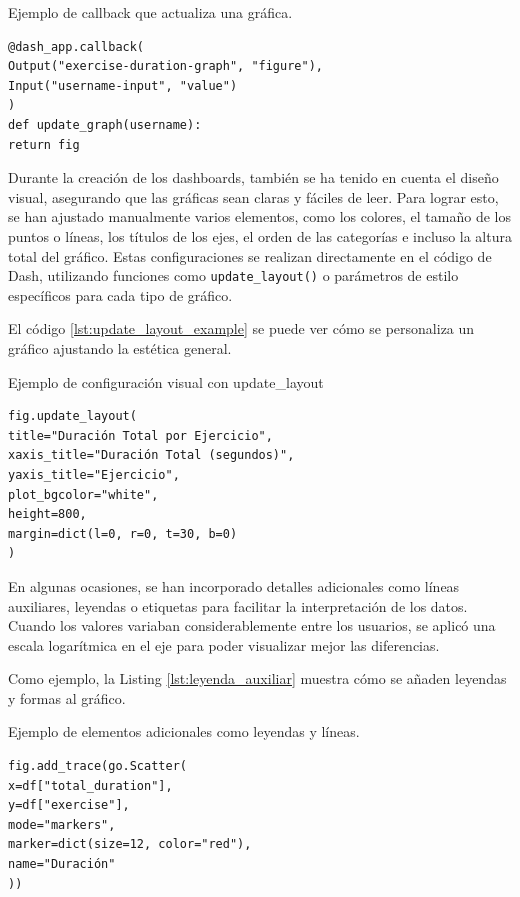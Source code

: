 \documentclass[a4paper, 12pt]{book}
\begin{document}
\begin{listing}[h!]
\caption{Ejemplo de callback que actualiza una gráfica.}{}
\label{lst:callback_example}
\begin{verbatim}
@dash_app.callback(
Output("exercise-duration-graph", "figure"),
Input("username-input", "value")
)
def update_graph(username):
return fig
\end{verbatim}
\end{listing}

Durante la creación de los dashboards, también se ha tenido en cuenta el diseño visual, asegurando que las gráficas sean claras y fáciles de leer. Para lograr esto, se han ajustado manualmente varios elementos, como los colores, el tamaño de los puntos o líneas, los títulos de los ejes, el orden de las categorías e incluso la altura total del gráfico. Estas configuraciones se realizan directamente en el código de Dash, utilizando funciones como \texttt{update\_layout()} o parámetros de estilo específicos para cada tipo de gráfico.

El código \ref{lst:update_layout_example} se puede ver cómo se personaliza un gráfico ajustando la estética general.

\begin{listing}[h!]
\caption{Ejemplo de configuración visual con update\_layout}
\label{lst:update_layout_example}
\begin{verbatim}
fig.update_layout(
title="Duración Total por Ejercicio",
xaxis_title="Duración Total (segundos)",
yaxis_title="Ejercicio",
plot_bgcolor="white",
height=800,
margin=dict(l=0, r=0, t=30, b=0)
)
\end{verbatim}
\end{listing}

En algunas ocasiones, se han incorporado detalles adicionales como líneas auxiliares, leyendas o etiquetas para facilitar la interpretación de los datos. Cuando los valores variaban considerablemente entre los usuarios, se aplicó una escala logarítmica en el eje para poder visualizar mejor las diferencias.

Como ejemplo, la Listing \ref{lst:leyenda_auxiliar} muestra cómo se añaden leyendas y formas al gráfico.

\begin{listing}[h!]
\caption{Ejemplo de elementos adicionales como leyendas y líneas.}{}
\label{lst:leyenda_auxiliar}
\begin{verbatim}
fig.add_trace(go.Scatter(
x=df["total_duration"],
y=df["exercise"],
mode="markers",
marker=dict(size=12, color="red"),
name="Duración"
))
\end{verbatim}
\end{listing}
\end{document}
